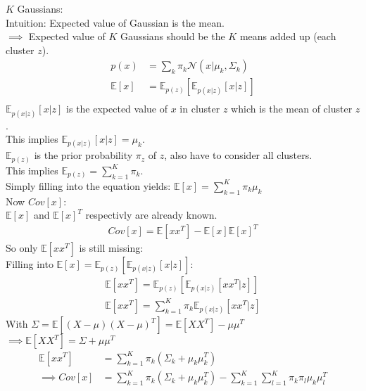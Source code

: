 \begin{flushleft}
$K$ Gaussians:\\
Intuition: Expected value of Gaussian is the mean.\\
$\implies$ Expected value of $K$ Gaussians should be the $K$ means 
added up (each cluster $z$).
\begin{align*}
p(x) &= \sum_{k} \pi_k \mathcal{N}(x | \mu_k , \Sigma_k)\\
\mathbb{E}[x] &= \mathbb{E}_{p(z)} [ \mathbb{E}_{p(x|z)}[x|z]]\\
\end{align*}
$\mathbb{E}_{p(x|z)}[x|z]$ is the expected value of $x$ in cluster 
$z$ which is the mean of cluster $z$.\\
This implies $\mathbb{E}_{p(x|z)}[x|z] = \mu_{k}$.\\
$\mathbb{E}_{p(z)}$ is the prior probability $\pi_z$ of $z$, also have to consider all clusters.\\
This implies $\mathbb{E}_{p(z)} = \sum_{k=1}^{K} \pi_{k}$.\\
Simply filling into the equation yields: 
$\mathbb{E}[x] = \sum_{k=1}^{K} \pi_{k} \mu_k$\\
Now $Cov[x]$:\\
$\mathbb{E}[x]$ and $\mathbb{E}[x]^T$ respectivly are already known.
\begin{align*}
Cov[x] = \mathbb{E}[xx^T] - \mathbb{E}[x] \mathbb{E}[x]^T
\end{align*}
So only $\mathbb{E}[xx^T]$ is still missing:\\
Filling into $\mathbb{E}[x] = \mathbb{E}_{p(z)} [ \mathbb{E}_{p(x|z)}[x|z]]$:
\begin{align*}
\mathbb{E}[xx^T] = \mathbb{E}_{p(z)} [ \mathbb{E}_{p(x|z)}[xx^T|z]]\\
\mathbb{E}[xx^T] = \sum_{k=1}^{K} \pi_{k} \mathbb{E}_{p(x|z)}[xx^T|z]
\end{align*}
With $\Sigma = \mathbb{E}[(X - \mu) (X - \mu)^T] = \mathbb{E}[XX^T] - \mu \mu^T$\\
$\implies \mathbb{E}[XX^T] = \Sigma + \mu \mu^T$
\begin{align*}
\mathbb{E}[xx^T] &= \sum_{k=1}^{K} \pi_{k} (\Sigma_k + \mu_k \mu_k^T)\\
\implies Cov[x] &= \sum_{k=1}^{K} \pi_{k} (\Sigma_k + \mu_k \mu_k^T) - 
\sum_{k=1}^K \sum_{l=1}^K \pi_k \pi_l \mu_k \mu_l^T
\end{align*}
\end{flushleft}
%
%
%
%
%
%
%
%




